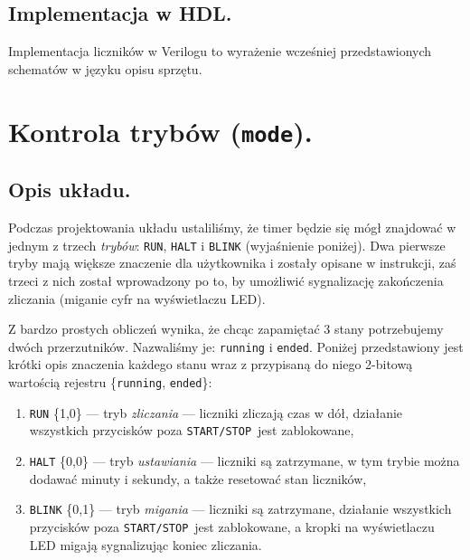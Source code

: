 \documentclass[a4paper,oneside]{report}
\newcommand{\startstop}{\texttt{START/STOP}}
\newcommand{\counter}[1]{\texttt{counter\textunderscore #1}}
\newcommand{\mode}{\texttt{mode}}
\begin{document}
\subsection{Implementacja w HDL.}
Implementacja liczników w Verilogu to wyrażenie wcześniej
przedstawionych schematów w języku opisu sprzętu.



\section{Kontrola trybów (\mode).}
\subsection{Opis układu.}
Podczas projektowania układu ustaliliśmy, że timer będzie się mógł
znajdować w jednym z trzech \emph{trybów}: \texttt{RUN},
\texttt{HALT} i \texttt{BLINK} (wyjaśnienie poniżej). Dwa pierwsze
tryby mają większe znaczenie dla użytkownika i zostały opisane w
instrukcji, zaś trzeci z nich został wprowadzony po to, by
umożliwić sygnalizację zakończenia zliczania (miganie cyfr
na wyświetlaczu LED).

Z bardzo prostych obliczeń wynika, że chcąc zapamiętać 3 stany
potrzebujemy dwóch przerzutników. Nazwaliśmy je: \texttt{running} i
\texttt{ended}. Poniżej przedstawiony jest krótki opis znaczenia
każdego stanu wraz z przypisaną do niego 2-bitową wartością
rejestru \{\texttt{running}, \texttt{ended}\}:
\begin{enumerate}
\item \texttt{RUN} \{1,0\} --- tryb \emph{zliczania} --- liczniki
zliczają czas w dół, działanie wszystkich przycisków poza
\startstop\ jest zablokowane,
\item \texttt{HALT} \{0,0\} --- tryb \emph{ustawiania} --- liczniki
są zatrzymane, w tym trybie można dodawać minuty i sekundy, a także
resetować stan liczników,
\item \texttt{BLINK} \{0,1\} --- tryb \emph{migania} --- liczniki
są zatrzymane, działanie wszystkich przycisków poza \startstop\
jest zablokowane, a kropki na wyświetlaczu LED migają sygnalizując
koniec zliczania.
\end{enumerate}
\end{document}
